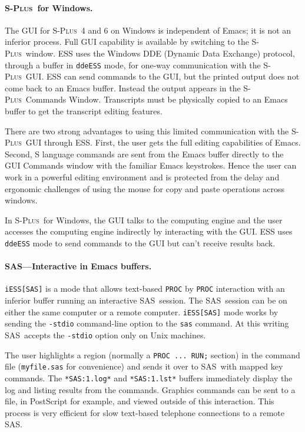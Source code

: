 \documentclass{article}
\newcommand*{\SAS}{\textsc{SAS}}
\newcommand*{\Splus}{\textsc{S-Plus}}
\newcommand{\stexttt}[1]{{\small\texttt{#1}}}
\begin{document}
\paragraph{\Splus\ for Windows.}
The GUI for \Splus\ 4 and 6 on Windows is independent of Emacs; it is not
an inferior process.  Full GUI
capability is available by switching to the \Splus\ window.
ESS uses the Windows DDE (Dynamic Data Exchange) protocol,
through a buffer in \stexttt{ddeESS} mode, for one-way communication with
the \Splus\ GUI.
ESS can send commands to the GUI, but the printed
output does not come back to an Emacs buffer.  Instead the output appears in
the \Splus\ Commands Window.  Transcripts must be physically copied to
an Emacs buffer to get the transcript editing features.

There are two strong advantages to using this limited communication
with the \Splus\ GUI through ESS.  First, the user gets the full
editing capabilities of Emacs.  Second, S language commands are sent
from the Emacs buffer directly to the GUI Commands window with the
familiar Emacs keystrokes.  Hence the user can work in a powerful
editing environment and is protected from the delay and ergonomic
challenges of using the mouse for copy and paste operations across
windows.

In \Splus\ for Windows, the GUI
talks to the computing engine and the user accesses the computing
engine indirectly by interacting with the GUI.  ESS uses
\stexttt{ddeESS} mode to send commands to the GUI but can't receive
results back.

\paragraph{\SAS---Interactive in Emacs buffers.}

\stexttt{iESS[SAS]} is a mode that allows text-based \stexttt{PROC} by
\stexttt{PROC} interaction with an inferior buffer running an
interactive \SAS\ session.  The \SAS\ session can be on either the
same computer or a remote computer.  \stexttt{iESS[SAS]} mode works by
sending the \stexttt{-stdio} command-line option to the \stexttt{sas}
command.  At this writing \SAS\ accepts the \stexttt{-stdio} option
only on Unix machines.

The user highlights a region (normally a \stexttt{PROC ... RUN;}
section) in the command file (\stexttt{myfile.sas} for convenience)
and sends it over to \SAS\ with mapped key commands.  The
\stexttt{*SAS:1.log*} and \stexttt{*SAS:1.lst*} buffers immediately
display the log and listing results from the commands.
Graphics commands can be sent to a file, in PostScript for example,
and viewed outside of this interaction.  This process is very efficient
for slow text-based telephone connections to a remote \SAS.
\end{document}
